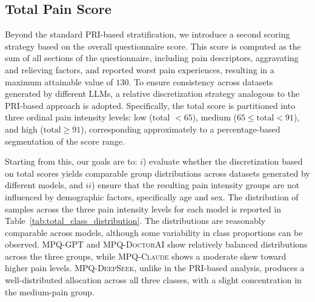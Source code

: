 \documentclass[preprint,12pt,authoryear]{elsarticle}
\newcommand{\ste}[1]{\textcolor{red}{[Stefano: #1]}}
\newcommand{\dbGPT}{\small\textsc{MPQ-GPT}\xspace}
\newcommand{\dbClaude}{\small\textsc{MPQ-Claude}\xspace}
\newcommand{\dbDeepSeek}{\small\textsc{MPQ-DeepSeek}\xspace}
\newcommand{\dbDoctorAI}{\small\textsc{MPQ-DoctorAI}\xspace}
\begin{document}








\subsection{Total Pain Score}
Beyond the standard PRI-based stratification, we introduce a second scoring strategy based on the overall questionnaire score. This score is computed as the sum of all sections of the questionnaire, including pain descriptors, aggravating and relieving factors, and reported worst pain experiences, resulting in a maximum attainable value of $130$. To ensure consistency across datasets generated by different LLMs, a relative discretization strategy analogous to the PRI-based approach is adopted. Specifically, the total score is partitioned into three ordinal pain intensity levels: low (total $< 65$), medium ($65 \leq \text{total} < 91$), and high ($\text{total} \geq 91$), corresponding approximately to a percentage-based segmentation of the score range.

Starting from this, our goals are to: $i$) evaluate whether the discretization based on total scores yields comparable group distributions across datasets generated by different models, and $ii$) ensure that the resulting pain intensity groups are not influenced by demographic factors, specifically age and sex. The distribution of samples across the three pain intensity levels for each model is reported in Table~\ref{tab:total_class_distribution}. The distributions are reasonably comparable across models, although some variability in class proportions can be observed. \dbGPT and \dbDoctorAI show relatively balanced distributions across the three groups, while \dbClaude shows a moderate skew toward higher pain levels. \dbDeepSeek, unlike in the PRI-based analysis, produces a well-distributed allocation across all three classes, with a slight concentration in the medium-pain group.
\end{document}
